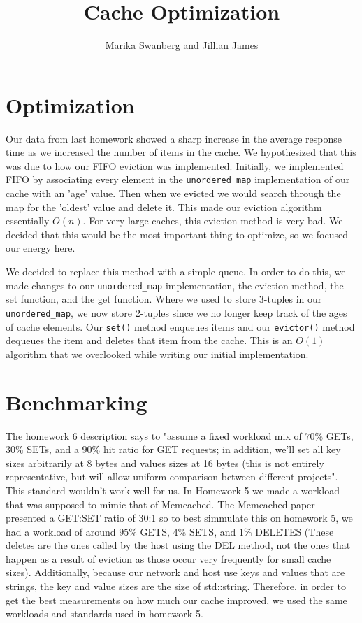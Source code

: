 \documentclass[12pt]{article}
\author{Marika Swanberg and Jillian James}
\title{Cache Optimization}
\date{}
\begin{document}
\maketitle
\section{Optimization}
Our data from last homework showed a sharp increase in the average response time as we increased the number of items in the cache. We hypothesized that this was due to how our FIFO eviction was implemented. Initially, we implemented FIFO by associating every element in the \texttt{unordered\_map} implementation of our cache with an 'age' value. Then when we evicted we would search through the map for the 'oldest' value and delete it. This made our eviction algorithm essentially $O(n)$. For very large caches, this eviction method is very bad. We decided that this would be the most important thing to optimize, so we focused our energy here. 

We decided to replace this method with a simple queue. In order to do this, we made changes to our \texttt{unordered\_map} implementation, the eviction method, the set function, and the get function. Where we used to store 3-tuples in our \texttt{unordered\_map}, we now store 2-tuples since we no longer keep track of the ages of cache elements. Our \texttt{set()} method enqueues items and our \texttt{evictor()} method dequeues the item and deletes that item from the cache. This is an $O(1)$ algorithm that we overlooked while writing our initial implementation.


\section{Benchmarking}
The homework 6 description says to "assume a fixed workload mix of $70\%$ GETs, $30\%$ SETs, and a $90\%$ hit ratio for GET requests; in addition, we'll set all key sizes arbitrarily at 8 bytes and values sizes at 16 bytes (this is not entirely representative, but will allow uniform comparison between different projects". This standard wouldn't work well for us. In Homework 5 we made a workload that was supposed to mimic that of Memcached. The Memcached paper presented a GET:SET ratio of 30:1 so to best simmulate this on homework 5, we had a workload of around $95\%$ GETS, $4\%$ SETS, and $1\%$ DELETES (These deletes are the ones called by the host using the DEL method, not the ones that happen as a result of eviction as those occur very frequently for small cache sizes). Additionally, because our network and host use keys and values that are strings, the key and value sizes are the size of std::string. Therefore, in order to get the best measurements on how much our cache improved, we used the same workloads and standards used in homework 5.
\end{document}
